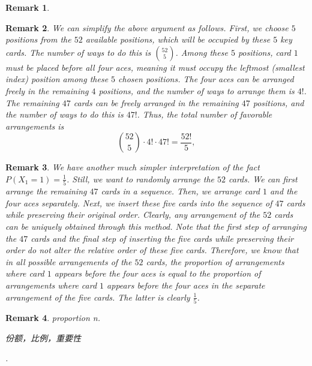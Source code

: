 \documentclass[12pt,letterpaper, onecolumn]{exam}
\newtheorem{remark}{Remark}
\begin{document}
\begin{questions}
\begin{remark}
        \end{remark}
        \begin{remark}
            We can simplify the above argument as follows. First, we choose $5$ positions from the $52$ available positions, which will be occupied by these $5$ key cards. The number of ways to do this is $\binom{52}{5}$. Among these $5$ positions, card $1$ must be placed before all four aces, meaning it must occupy the leftmost (smallest index) position among these $5$ chosen positions. The four aces can be arranged freely in the remaining $4$ positions, and the number of ways to arrange them is $4!$. The remaining $47$ cards can be freely arranged in the remaining $47$ positions, and the number of ways to do this is $47!$. Thus, the total number of favorable arrangements is
            $$\binom{52}{5}\cdot 4!\cdot 47!=\frac{52!}{5},$$
        \end{remark}
        \begin{remark}
            We have another much simpler interpretation of the fact $P(X_1=1)=\frac{1}{5}$. Still, we want to randomly arrange the $52$ cards. We can first arrange the remaining $47$ cards in a sequence. Then, we arrange card $1$ and the four aces separately. Next, we insert these five cards into the sequence of $47$ cards while preserving their original order. Clearly, any arrangement of the $52$ cards can be uniquely obtained through this method. Note that the first step of arranging the $47$ cards and the final step of inserting the five cards while preserving their order do not alter the relative order of these five cards. Therefore, we know that in all possible arrangements of the $52$ cards, the proportion of arrangements where card $1$ appears before the four aces is equal to the proportion of arrangements where card $1$ appears before the four aces in the separate arrangement of the five cards. The latter is clearly $\frac{1}{5}$.
        \end{remark}
        \begin{remark}
            proportion  n. \begin{CJK}{UTF8}{gbsn}份额，比例，重要性\end{CJK}.
        \end{remark}


\end{questions}
\end{document}

